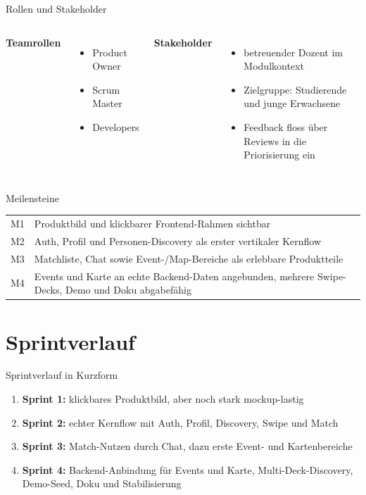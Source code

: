 \documentclass[
amberg,
compressedtitleimages,
toc=fancy,
footlinebox,
nometaot
]{OTHAWbeamer}
\begin{document}
\begin{frame}{Rollen und Stakeholder}
  \begin{columns}[T]
    \textbf{Teamrollen}
    \begin{itemize}
      \item Product Owner
      \item Scrum Master
      \item Developers
    \end{itemize}

    \textbf{Stakeholder}
    \begin{itemize}
      \item betreuender Dozent im Modulkontext
      \item Zielgruppe: Studierende und junge Erwachsene
      \item Feedback floss über Reviews in die Priorisierung ein
    \end{itemize}
  \end{columns}
\end{frame}

\begin{frame}{Meilensteine}
  \begin{tabularx}{\textwidth}{@{}l X@{}}
    M1 & Produktbild und klickbarer Frontend-Rahmen sichtbar \\
    M2 & Auth, Profil und Personen-Discovery als erster vertikaler Kernflow \\
    M3 & Matchliste, Chat sowie Event-/Map-Bereiche als erlebbare Produktteile \\
    M4 & Events und Karte an echte Backend-Daten angebunden, mehrere Swipe-Decks, Demo und Doku abgabefähig \\
  \end{tabularx}
\end{frame}

\section{Sprintverlauf}

\begin{frame}{Sprintverlauf in Kurzform}
  \begin{enumerate}
    \item \textbf{Sprint 1:} klickbares Produktbild, aber noch stark mockup-lastig
    \item \textbf{Sprint 2:} echter Kernflow mit Auth, Profil, Discovery, Swipe und Match
    \item \textbf{Sprint 3:} Match-Nutzen durch Chat, dazu erste Event- und Kartenbereiche
    \item \textbf{Sprint 4:} Backend-Anbindung für Events und Karte, Multi-Deck-Discovery, Demo-Seed, Doku und Stabilisierung
  \end{enumerate}
\end{frame}
\end{document}
